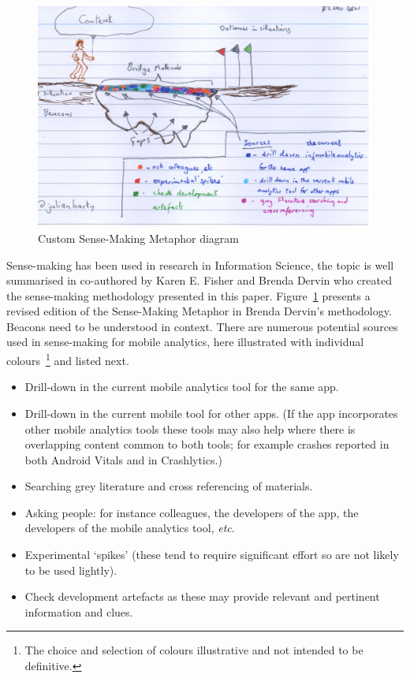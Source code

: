 \begin{figure}
    \centering
    \includegraphics[width=12cm]{images/rough-sketches/the-sense-making-metafor-revised.jpeg}
    \caption{Custom Sense-Making Metaphor diagram}
    \label{fig:the-sense-making-metafor-revised}
\end{figure}

Sense-making has been used in research in Information Science, the topic is well summarised in \citealt{naumer2008_sense_making} co-authored by Karen E. Fisher and Brenda Dervin who created the sense-making methodology presented in this paper. Figure~\ref{fig:the-sense-making-metafor-revised} presents a revised edition of the Sense-Making Metaphor in Brenda Dervin's methodology. Beacons need to be understood in context. There are numerous potential sources used in sense-making for mobile analytics, here illustrated with individual colours~\footnote{The choice and selection of colours illustrative and not intended to be definitive.} and listed next.

\begin{itemize}
\itemsep0em
    \item Drill-down in the current mobile analytics tool for the same app.
    \item Drill-down in the current mobile tool for other apps. (If the app incorporates other mobile analytics tools these tools may also help where there is overlapping content common to both tools; for example crashes reported in both Android Vitals and in Crashlytics.)
    \item Searching grey literature and cross referencing of materials.
    \item Asking people: for instance colleagues, the developers of the app, the developers of the mobile analytics tool, \textit{etc}.
    \item Experimental `spikes' (these tend to require significant effort so are not likely to be used lightly).
    \item Check development artefacts as these may provide relevant and pertinent information and clues.
\end{itemize}

